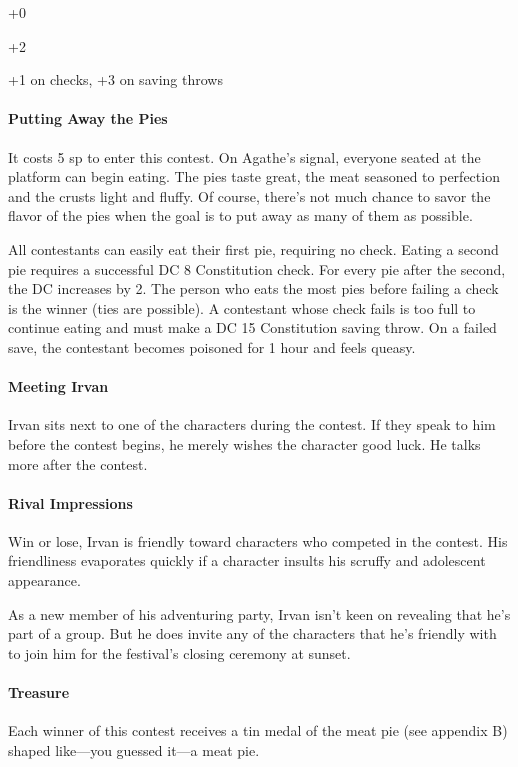 \documentclass[10pt,a4paper,twoside,bg=print,twocolumn,openany,nodeprecatedcode]{dndbook}
\begin{document}
\begin{description}[nolistsep]
\item[Male Drow:]
+0
\item[Female Halfling:]
+2
\item[Irvan Wastewalker:]
+1 on checks, +3 on saving throws
\end{description}

\paragraph{Putting Away the Pies}
It costs 5 sp to enter this contest. On Agathe's signal, everyone seated at the platform can begin eating. The pies taste great, the meat seasoned to perfection and the crusts light and fluffy. Of course, there's not much chance to savor the flavor of the pies when the goal is to put away as many of them as possible.

All contestants can easily eat their first pie, requiring no check. Eating a second pie requires a successful DC 8 Constitution check. For every pie after the second, the DC increases by 2. The person who eats the most pies before failing a check is the winner (ties are possible). A contestant whose check fails is too full to continue eating and must make a DC 15 Constitution saving throw. On a failed save, the contestant becomes poisoned for 1 hour and feels queasy.

\paragraph{Meeting Irvan}
Irvan sits next to one of the characters during the contest. If they speak to him before the contest begins, he merely wishes the character good luck. He talks more after the contest.

\paragraph{Rival Impressions}
Win or lose, Irvan is friendly toward characters who competed in the contest. His friendliness evaporates quickly if a character insults his scruffy and adolescent appearance.

As a new member of his adventuring party, Irvan isn't keen on revealing that he's part of a group. But he does invite any of the characters that he's friendly with to join him for the festival's closing ceremony at sunset.

\paragraph{Treasure}
Each winner of this contest receives a tin medal of the meat pie (see appendix B) shaped like—you guessed it—a meat pie.
\end{document}
